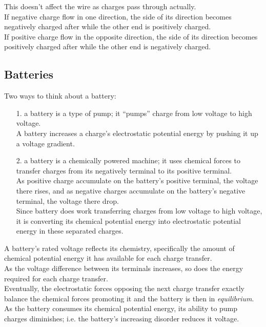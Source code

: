 \documentclass[12pt]{article}
\theoremstyle{definition}
\begin{document}
This doesn't affect the wire as charges pass through actually. \\
If negative charge flow in one direction, the side of its direction becomes negatively charged after while the other end is positively charged. \\
If positive charge flow in the opposite direction, the side of its direction becomes positively charged after while the other end is negatively charged.

\subsection{Batteries}
Two ways to think about a battery:
\begin{itemize}
  \item[1.] a battery is a type of pump;
  it ``pumps'' charge from low voltage to high voltage. \\
  A battery increases a charge's electrostatic potential energy by pushing it up a voltage gradient.

  \item[2.] a battery is a chemically powered machine;
  it uses chemical forces to transfer charges from its negatively terminal to its positive terminal. \\
  As positive charge accumulate on the battery's positive terminal, the voltage there rises, and as negative charges accumulate on the battery's negative terminal, the voltage there drop. \\
  Since battery does work transferring charges from low voltage to high voltage, it is converting its chemical potential energy into electrostatic potential energy in these separated charges.
\end{itemize}

A battery's rated voltage reflects its chemistry, specifically the amount of chemical potential energy it has available for each charge transfer. \\
As the voltage difference between its terminals increases, so does the energy required for each charge transfer. \\
Eventually, the electrostatic forces opposing the next charge transfer exactly balance the chemical forces promoting it and the battery is then in \emph{equilibrium}. \\

As the battery consumes its chemical potential energy, its ability to pump charges diminishes;
i.e. the battery's increasing disorder reduces it voltage. \\
\end{document}
